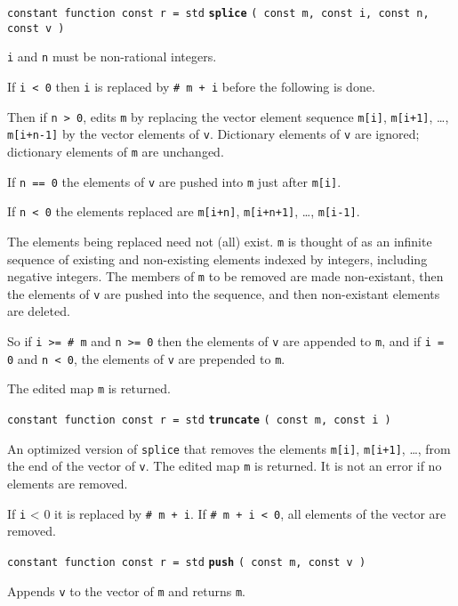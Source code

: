 \documentclass[12pt]{article}
\newcommand{\ttkey}[1]{{\tt \bfseries #1}}
\newenvironment{indpar}[1][0.3in]%
	{\begin{list}{}%
		     {\setlength{\itemsep}{0in}%
		      \setlength{\topsep}{0in}%
		      \setlength{\parsep}{1ex}%
		      \setlength{\labelwidth}{#1}%
		      \setlength{\leftmargin}{#1}%
		      \addtolength{\leftmargin}{\labelsep}}%
	 \item}%
	{\end{list}}
\begin{document}
{\tt constant function const r = std} \ttkey{splice}
    {\tt ( const m, const i, const n, const v )}
\begin{indpar}
{\tt i} and {\tt n} must be non-rational integers.

If {\tt i < 0} then {\tt i} is replaced by {\tt \# m + i} before the
following is done.

Then if {\tt n > 0},
edits {\tt m} by replacing the vector element sequence
{\tt m[i]}, {\tt m[i+1]}, \ldots, {\tt m[i+n-1]} by the
vector elements of {\tt v}.  Dictionary elements of {\tt v} are ignored;
dictionary elements of {\tt m} are unchanged.

If {\tt n == 0}
the elements of {\tt v} are pushed into {\tt m}
just after {\tt m[i]}.

If {\tt n < 0} the elements replaced are
{\tt m[i+n]}, {\tt m[i+n+1]}, \ldots, {\tt m[i-1]}.

The elements being replaced need not (all) exist.  {\tt m} is thought
of as an infinite sequence of existing and non-existing elements indexed
by integers, including negative integers.  The members of
{\tt m} to be removed are made non-existant,
then the elements of {\tt v} are pushed
into the sequence, and then non-existant elements are deleted.

So if {\tt i >= \# m} and {\tt n >= 0} then the elements of {\tt v}
are appended to {\tt m}, and if {\tt i = 0} and {\tt n < 0}, the
elements of {\tt v} are prepended to {\tt m}.

The edited map {\tt m} is returned.

\end{indpar}

{\tt constant function const r = std} \ttkey{truncate}
                                      {\tt ( const m, const i )}
\begin{indpar}
An optimized version of {\tt splice} that removes the elements
{\tt m[i]}, {\tt m[i+1]}, \ldots, from the end of the vector of {\tt v}.
The edited map {\tt m} is returned.  It is not an error if no elements
are removed.

If {\tt i} < 0 it is replaced by {\tt \# m + i}.  If {\tt \# m + i < 0},
all elements of the vector are removed.
\end{indpar}

{\tt constant function const r = std} \ttkey{push} {\tt ( const m, const v )}
\begin{indpar}
Appends {\tt v} to the vector of {\tt m} and returns {\tt m}.
\end{indpar}
\end{document}
